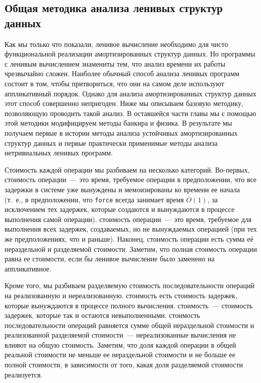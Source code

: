 \subsection{Общая методика анализа ленивых структур данных}
\label{sc:6.2.2}

Как мы только что показали, ленивое вычисление необходимо для чисто
функциональной реализации амортизированных структур данных. Но
программы с ленивым вычислением знамениты тем, что анализ времени их
работы чрезвычайно сложен. Наиболее обычный способ анализа ленивых
программ состоит в том, чтобы притвориться, что они на самом деле
используют аппликативный порядок. Однако для анализа амортизированных
структур данных этот способ совершенно непригоден. Ниже мы описываем
базовую методику, позволяющую проводить такой анализ. В оставшейся
части главы мы с помощью этой методики модифицируем методы банкира и
физика. В результате мы получаем первые в истории методы анализа
устойчивых амортизированных структур данных и первые практически применимые
методы анализа нетривиальных ленивых программ.

Стоимость каждой операции мы разбиваем на несколько категорий. Во-первых,
 стоимость операции~--- это время,
требуемое операции в предположении, что все задержки в системе уже
вынуждены и мемоизированы ко времени ее начала (т.~е., в
предположении, что \lstinline!force! всегда занимает время $O(1)$, за
исключением тех задержек, которые создаются и вынуждаются в процессе
выполнения самой операции).  стоимость
операции~--- это время, требуемое для выполнения всех задержек,
создаваемых, но не вынуждаемых операцией (при тех же предположениях,
что и раньше). Наконец,  стоимость операции
есть сумма её нераздельной и разделяемой стоимости. Заметим, что
полная стоимость операции равна ее стоимости, если бы ленивое
вычисление было заменено на аппликативное.

Кроме того, мы разбиваем разделяемую стоимость последовательности
операций на реализованную и
нереализованную.  стоимость есть
стоимость задержек, которые вынуждаются в процессе полного
вычисления.  стоимость~--- стоимость
задержек, которые так и остаются невыполненными.  стоимость последовательности операций
равняется сумме общей нераздельной стоимости и реализованной
разделяемой стоимости~--- нереализованные вычисления не влияют на
общую стоимость. Заметим, что доля каждой операции в общей реальной
стоимости не меньше ее нераздельной стоимости и не больше ее полной
стоимости, в зависимости от того, какая доля разделяемой стоимости
реализуется.


